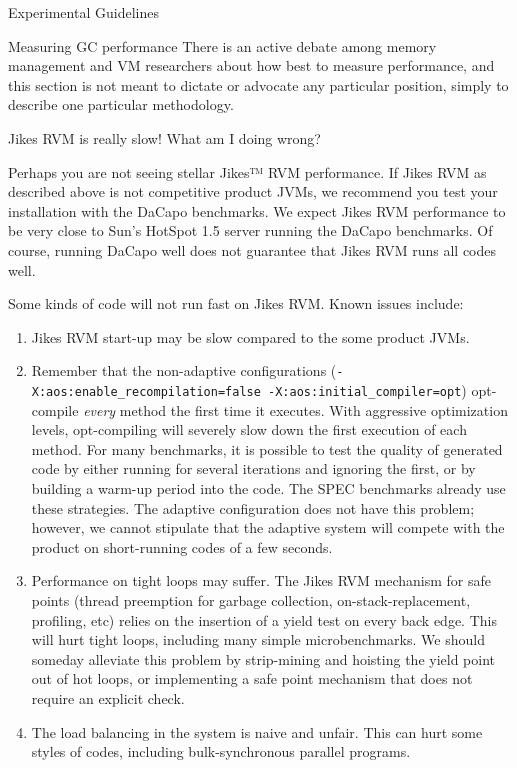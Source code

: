 \begin{section}{Experimental Guidelines}
\begin{subsection}{Measuring GC performance}
There is an active debate among memory management and VM researchers about how best to measure performance, and this section is not meant to dictate or advocate any particular position, simply to describe one particular methodology.

\end{subsection}


\begin{subsection}{Jikes RVM is really slow! What am I doing wrong?}

Perhaps you are not seeing stellar Jikes™ RVM performance. If Jikes RVM as described above is not competitive product JVMs, we recommend you test your installation with the DaCapo benchmarks. We expect Jikes RVM performance to be very close to Sun's HotSpot 1.5 server running the DaCapo benchmarks. Of course, running DaCapo well does not guarantee that Jikes RVM runs all codes well.

Some kinds of code will not run fast on Jikes RVM. Known issues include:
\begin{enumerate}
  \item Jikes RVM start-up may be slow compared to the some product JVMs.
  \item Remember that the non-adaptive configurations (\texttt{-X:aos:enable\_recompilation=false -X:aos:initial\_compiler=opt}) opt-compile \textit{every} method the first time it executes. With aggressive optimization levels, opt-compiling will severely slow down the first execution of each method. For many benchmarks, it is possible to test the quality of generated code by either running for several iterations and ignoring the first, or by building a warm-up period into the code. The SPEC benchmarks already use these strategies. The adaptive configuration does not have this problem; however, we cannot stipulate that the adaptive system will compete with the product on short-running codes of a few seconds.
  \item Performance on tight loops may suffer. The Jikes RVM mechanism for safe points (thread preemption for garbage collection, on-stack-replacement, profiling, etc) relies on the insertion of a yield test on every back edge. This will hurt tight loops, including many simple microbenchmarks. We should someday alleviate this problem by strip-mining and hoisting the yield point out of hot loops, or implementing a safe point mechanism that does not require an explicit check.
  \item The load balancing in the system is naive and unfair. This can hurt some styles of codes, including bulk-synchronous parallel programs.
\end{enumerate}


\end{subsection}
\end{section}
